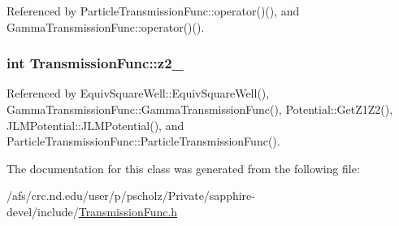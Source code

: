 Referenced by Particle\-Transmission\-Func\-::operator()(), and Gamma\-Transmission\-Func\-::operator()().

\hypertarget{classTransmissionFunc_ac0a75ed458ba6c9072c5e66a9f2e43fc}{
\subsubsection[{z2\-\_\-}]{\setlength{\rightskip}{0pt plus 5cm}int Transmission\-Func\-::z2\-\_\-\hspace{0.3cm}{\ttfamily [protected]}}}\label{classTransmissionFunc_ac0a75ed458ba6c9072c5e66a9f2e43fc}


Referenced by Equiv\-Square\-Well\-::\-Equiv\-Square\-Well(), Gamma\-Transmission\-Func\-::\-Gamma\-Transmission\-Func(), Potential\-::\-Get\-Z1\-Z2(), J\-L\-M\-Potential\-::\-J\-L\-M\-Potential(), and Particle\-Transmission\-Func\-::\-Particle\-Transmission\-Func().



The documentation for this class was generated from the following file\-:\begin{DoxyCompactItemize}
\item 
/afs/crc.\-nd.\-edu/user/p/pscholz/\-Private/sapphire-\/devel/include/\hyperlink{TransmissionFunc_8h}{Transmission\-Func.\-h}\end{DoxyCompactItemize}
